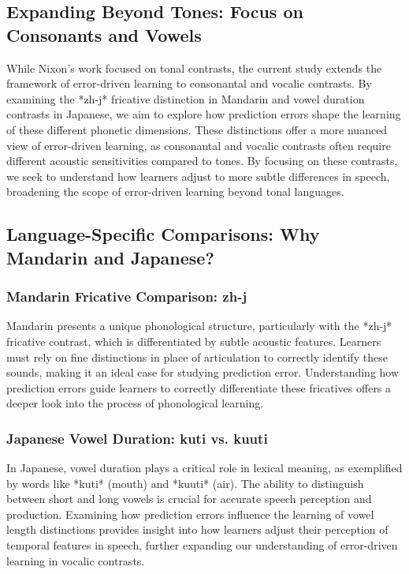 \subsection{Expanding Beyond Tones: Focus on Consonants and Vowels}

While Nixon's work focused on tonal contrasts, the current study extends the framework of error-driven learning to consonantal and vocalic contrasts. By examining the *zh-j* fricative distinction in Mandarin and vowel duration contrasts in Japanese, we aim to explore how prediction errors shape the learning of these different phonetic dimensions. These distinctions offer a more nuanced view of error-driven learning, as consonantal and vocalic contrasts often require different acoustic sensitivities compared to tones. By focusing on these contrasts, we seek to understand how learners adjust to more subtle differences in speech, broadening the scope of error-driven learning beyond tonal languages.

\subsection{Language-Specific Comparisons: Why Mandarin and Japanese?}

\subsubsection{Mandarin Fricative Comparison: zh-j}

Mandarin presents a unique phonological structure, particularly with the *zh-j* fricative contrast, which is differentiated by subtle acoustic features. Learners must rely on fine distinctions in place of articulation to correctly identify these sounds, making it an ideal case for studying prediction error. Understanding how prediction errors guide learners to correctly differentiate these fricatives offers a deeper look into the process of phonological learning.

\subsubsection{Japanese Vowel Duration: kuti vs. kuuti}

In Japanese, vowel duration plays a critical role in lexical meaning, as exemplified by words like *kuti* (mouth) and *kuuti* (air). The ability to distinguish between short and long vowels is crucial for accurate speech perception and production. Examining how prediction errors influence the learning of vowel length distinctions provides insight into how learners adjust their perception of temporal features in speech, further expanding our understanding of error-driven learning in vocalic contrasts.

